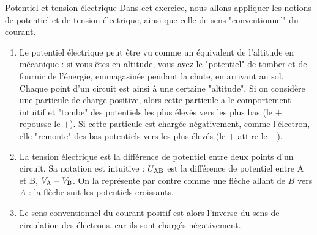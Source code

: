 \documentclass[10pt,a5paper,notitlepage]{book}
\begin{document}
\begin{defi}{Potentiel et tension électrique}
	Dans cet exercice, nous allons appliquer les notions de potentiel et de tension électrique, ainsi que celle de sens "conventionnel" du courant.
	\begin{enumerate}
		\item Le potentiel électrique peut être vu comme un équivalent de l'altitude en mécanique : si vous êtes en altitude, vous avez le "potentiel" de tomber et de fournir de l'énergie, emmagasinée pendant la chute, en arrivant au sol. Chaque point d'un circuit est ainsi à une certaine "altitude". Si on considère une particule de charge positive, alors cette particule a le comportement intuitif et "tombe" des potentiels les plus élevés vers les plus bas (le $+$ repousse le $+$). Si cette particule est chargée négativement, comme l'électron, elle "remonte" des bas potentiels vers les plus élevés (le $+$ attire le $-$).
		\item La tension électrique est la différence de potentiel entre deux points d'un circuit. Sa notation est intuitive : $U_{\rm AB}$ est la différence de potentiel entre A et B, $V_{\rm A} - V_{\rm B}$. On la représente par contre comme une flèche allant de $B$ vers $A$ : la flèche suit les potentiels croissants.
		\item Le sens conventionnel du courant positif est alors l'inverse du sens de circulation des électrons, car ils sont chargés négativement.
	\end{enumerate}
\end{defi}
\end{document}
